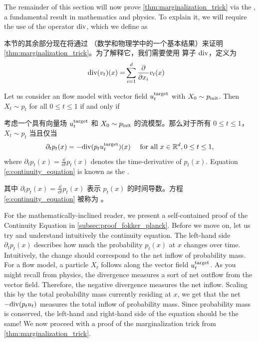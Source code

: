 The remainder of this section will now prove \cref{thm:marginalization_trick} via the , a fundamental result in mathematics and physics. To explain it, we will require the use of the  operator $\mathrm{div}$, which we define as

本节的其余部分现在将通过 （数学和物理学中的一个基本结果）来证明 \cref{thm:marginalization_trick}。为了解释它，我们需要使用  算子 $\mathrm{div}$，定义为
\begin{align}
\label{eq:divergence_laplacian_definition}
    \mathrm{div}(v_t)(x)=&\sum\limits_{i=1}^{d}\frac{\partial}{\partial x_i}v_t(x)
\end{align}
\begin{theorem}
\label{thm:continuity_equation}
Let us consider an flow model with vector field $u^{\text{target}}_t$ with $X_0\sim p_{\rm{init}}$. Then $X_t\sim p_t$ for all $0\leq t\leq 1$ if and only if

考虑一个具有向量场 $u^{\text{target}}_t$ 和 $X_0\sim p_{\rm{init}}$ 的流模型。那么对于所有 $0\leq t\leq 1$，$X_t\sim p_t$ 当且仅当
\begin{align}
\label{e:continuity_equation}
\partial_t p_t(x)=-\mathrm{div} (p_tu^{\text{target}}_t)(x)\quad \text{ for all }x\in\mathbb{R}^d, 0\leq t\leq 1,
\end{align}
where $\partial_tp_t(x)= \frac{\dd}{\dd t}p_t(x)$ denotes the time-derivative of $p_t(x)$. Equation \ref{e:continuity_equation} is known as the .

其中 $\partial_tp_t(x)= \frac{\dd}{\dd t}p_t(x)$ 表示 $p_t(x)$ 的时间导数。方程 \ref{e:continuity_equation} 被称为 。
\end{theorem}
For the mathematically-inclined reader, we present a self-contained proof of the Continuity Equation in \cref{subsec:proof_fokker_planck}. Before we move on, let us try and understand intuitively the continuity equation. The left-hand side $\partial_tp_t(x)$ describes how much the probability $p_t(x)$ at $x$ changes over time. Intuitively, the change should correspond to the net inflow of probability mass. For a flow model, a particle $X_t$ follows along the vector field $u^{\text{target}}_t$. As you might recall from physics, the divergence measures a sort of net outflow from the vector field. Therefore, the negative divergence measures the net inflow. Scaling this by the total probability mass currently residing at $x$, we get that the net $-\mathrm{div} (p_tu_t)$ measures the total inflow of probability mass. Since probability mass is conserved, the left-hand and right-hand side of the equation should be the same! We now proceed with a proof of the marginalization trick from \cref{thm:marginalization_trick}.

